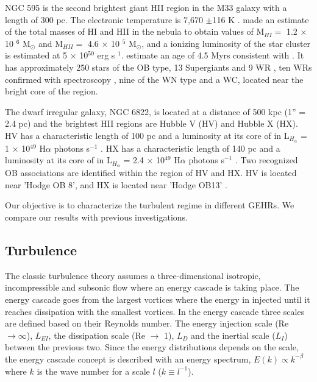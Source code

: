 \documentclass[fleqn,usenatbib]{mnras}
\begin{document}
NGC 595 is the second brightest giant HII region in the M33 galaxy with a length of 300 pc. The electronic temperature is 7,670 $\pm$116 K \citep{2010MNRAS.402.1635R}. \cite{1983A&A...119..185V} made an estimate of the total masses of HI and HII in the nebula to obtain values of M$_{HI}=$ 1.2 $\times$ 10 $^{6}$ M$_{\odot}$ and M$_{HII} =$ 4.6 $\times$ 10 $^{5}$ M$_{\odot}$, and a ionizing luminosity of the star cluster is estimated at 5 $\times$ 10$^{50}$ erg s $^{1}$. \cite{1996AJ....111.1128M} estimate an age of 4.5 Myrs consistent with \cite{1993AJ....105.1400D}. It has approximately 250 stars of the OB type, 13 Supergiants and 9 WR \citep{1996AJ....111.1128M}, ten WRs confirmed with spectroscopy \cite{1993AJ....105.1400D}, nine of the WN type and a WC, located near the bright core of the region.

The dwarf irregular galaxy, NGC 6822, is located at a distance of 500 kpc (1'' = 2.4 pc) \citep{1996AJ....112.1928G} and the brightest HII regions are Hubble V (HV) and Hubble X (HX). HV has a characteristic length of 100 pc and a luminosity at its core of in L$_{H_\alpha}$ = 1 $\times$ 10$^{49}$ H$\alpha$ photons s$^{-1}$ \citep{1999PASP..111.1382O}. HX has a characteristic length of 140 pc and a luminosity at its core of in L$_{H_\alpha}$ = 2.4 $\times$ 10$^{49}$ H$\alpha$ photons s$^{-1}$ \citep{1999PASP..111.1382O}. Two recognized OB associations \citep{1991ApJ...379..621H,1992AJ....104.1374W} are identified within the region of HV and HX. HV is located near 'Hodge OB 8', and HX is located near 'Hodge OB13'  \citep{1999PASP..111.1382O}.

Our objective is to characterize the turbulent regime in different GEHRs. We compare our results with previous investigations.

\subsection{Turbulence}\label{sec:turb}

The classic turbulence theory \citep{kolm1} assumes a three-dimensional isotropic, incompressible and subsonic flow where an energy cascade is taking place. The energy cascade goes from the largest vortices where the energy in injected until it reaches dissipation with the smallest vortices. 
In the energy cascade three scales are defined based on their Reynolds number. The energy injection scale (Re $\rightarrow \infty$), $L_{EI}$, the dissipation scale (Re $\rightarrow$ 1), $L_{D}$ and the inertial scale ($L_{I}$) between the previous two. Since the energy distributions depends on the scale, the energy cascade concept is described with an energy spectrum, $E(k) \propto k^{-\beta}$ where $k$ is the wave number for a scale $l$ ($k \equiv l^{-1}$).
\end{document}
